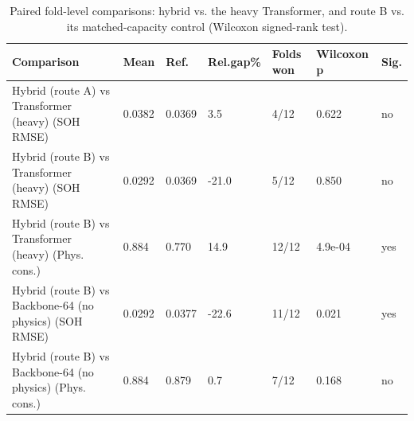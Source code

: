 \begin{table}
\caption{Paired fold-level comparisons: hybrid vs. the heavy Transformer, and route B vs. its matched-capacity control (Wilcoxon signed-rank test).}
\label{tab:t2_hybrid_vs_transformer}
\begin{tabular}{lllllll}
\toprule
Comparison & Mean & Ref. & Rel.gap\% & Folds won & Wilcoxon p & Sig. \\
\midrule
Hybrid (route A) vs Transformer (heavy) (SOH RMSE) & 0.0382 & 0.0369 & 3.5 & 4/12 & 0.622 & no \\
Hybrid (route B) vs Transformer (heavy) (SOH RMSE) & 0.0292 & 0.0369 & -21.0 & 5/12 & 0.850 & no \\
Hybrid (route B) vs Transformer (heavy) (Phys. cons.) & 0.884 & 0.770 & 14.9 & 12/12 & 4.9e-04 & yes \\
Hybrid (route B) vs Backbone-64 (no physics) (SOH RMSE) & 0.0292 & 0.0377 & -22.6 & 11/12 & 0.021 & yes \\
Hybrid (route B) vs Backbone-64 (no physics) (Phys. cons.) & 0.884 & 0.879 & 0.7 & 7/12 & 0.168 & no \\
\bottomrule
\end{tabular}
\end{table}
